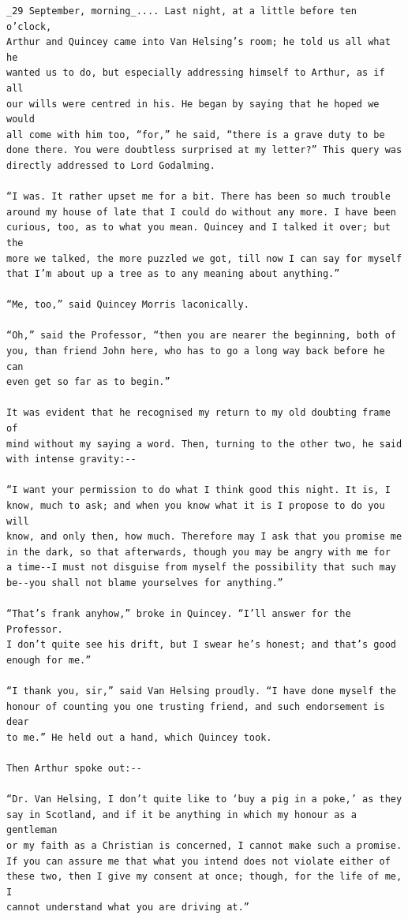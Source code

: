 \documentclass{article}
\begin{document}
\begin{verbatim}
_29 September, morning_.... Last night, at a little before ten o’clock,
Arthur and Quincey came into Van Helsing’s room; he told us all what he
wanted us to do, but especially addressing himself to Arthur, as if all
our wills were centred in his. He began by saying that he hoped we would
all come with him too, “for,” he said, “there is a grave duty to be
done there. You were doubtless surprised at my letter?” This query was
directly addressed to Lord Godalming.

“I was. It rather upset me for a bit. There has been so much trouble
around my house of late that I could do without any more. I have been
curious, too, as to what you mean. Quincey and I talked it over; but the
more we talked, the more puzzled we got, till now I can say for myself
that I’m about up a tree as to any meaning about anything.”

“Me, too,” said Quincey Morris laconically.

“Oh,” said the Professor, “then you are nearer the beginning, both of
you, than friend John here, who has to go a long way back before he can
even get so far as to begin.”

It was evident that he recognised my return to my old doubting frame of
mind without my saying a word. Then, turning to the other two, he said
with intense gravity:--

“I want your permission to do what I think good this night. It is, I
know, much to ask; and when you know what it is I propose to do you will
know, and only then, how much. Therefore may I ask that you promise me
in the dark, so that afterwards, though you may be angry with me for
a time--I must not disguise from myself the possibility that such may
be--you shall not blame yourselves for anything.”

“That’s frank anyhow,” broke in Quincey. “I’ll answer for the Professor.
I don’t quite see his drift, but I swear he’s honest; and that’s good
enough for me.”

“I thank you, sir,” said Van Helsing proudly. “I have done myself the
honour of counting you one trusting friend, and such endorsement is dear
to me.” He held out a hand, which Quincey took.

Then Arthur spoke out:--

“Dr. Van Helsing, I don’t quite like to ‘buy a pig in a poke,’ as they
say in Scotland, and if it be anything in which my honour as a gentleman
or my faith as a Christian is concerned, I cannot make such a promise.
If you can assure me that what you intend does not violate either of
these two, then I give my consent at once; though, for the life of me, I
cannot understand what you are driving at.”


\end{verbatim}
\end{document}
